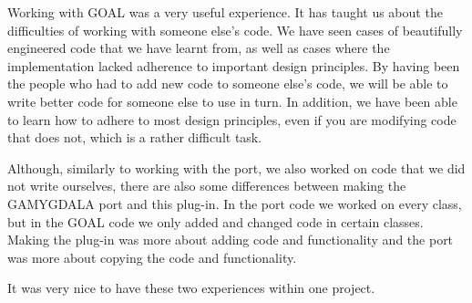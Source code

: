 Working with GOAL was a very useful experience. It has taught us about the difficulties of working with someone else's code. We have seen cases of beautifully engineered code that we have learnt from, as well as cases where the implementation lacked adherence to important design principles. By having been the people who had to add new code to someone else's code, we will be able to write better code for someone else to use in turn. In addition, we have been able to learn how to adhere to most design principles, even if you are modifying code that does not, which is a rather difficult task.

Although, similarly to working with the port, we also worked on code that we did not write ourselves, there are also some differences between making the GAMYGDALA port and this plug-in. In the port code we worked on every class, but in the GOAL code we only added and changed code in certain classes. Making the plug-in was more about adding code and functionality and the port was more about copying the code and functionality.

It was very nice to have these two experiences within one project.


